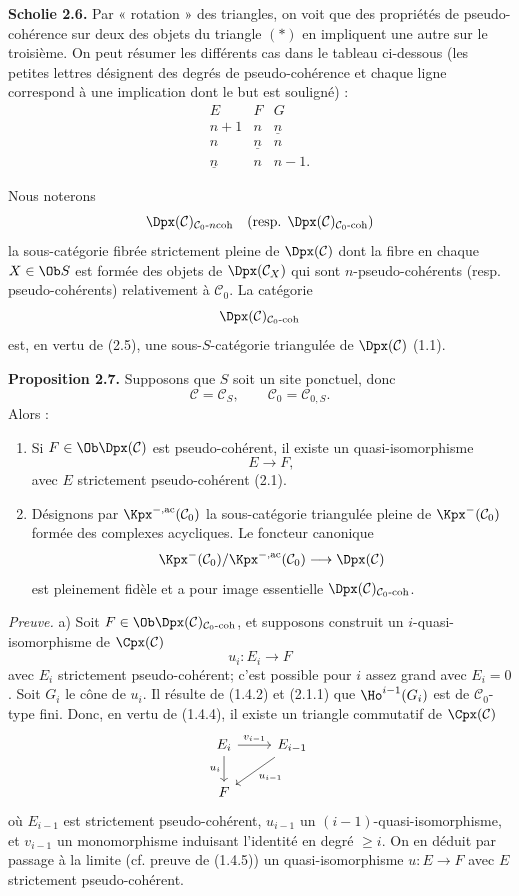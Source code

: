 \documentclass[11pt]{article}
\begin{document}
\textbf{Scholie 2.6.} Par « rotation » des triangles, on voit que des propriétés de pseudo-cohérence sur deux des objets du triangle \((*)\) en impliquent une autre sur le troisième. On peut résumer les différents cas dans le tableau ci-dessous (les petites lettres désignent des degrés de pseudo-cohérence et chaque ligne correspond à une implication dont le but est souligné) :
\[
\begin{array}{ccc}
E&F&G\\[0.2em]
n+1&n&\underline n\\
n&\underline n&n\\
\underline n&n&n-1 .
\end{array}
\]

Nous noterons
\[
  \Dpx(\mathcal C)_{\mathcal C_0\text{-}n\mathrm{coh}}
  \quad\text{(resp. }\Dpx(\mathcal C)_{\mathcal C_0\text{-}\mathrm{coh}}\text{)}
\]
la sous-catégorie fibrée strictement pleine de \(\Dpx(\mathcal C)\) dont la fibre en chaque \(X\in\Ob S\) est formée des objets de \(\Dpx(\mathcal C_X)\) qui sont \(n\)-pseudo-cohérents (resp. pseudo-cohérents) relativement à \(\mathcal C_0\). La catégorie
\[
  \Dpx(\mathcal C)_{\mathcal C_0\text{-}\mathrm{coh}}
\]
est, en vertu de (2.5), une sous-\(S\)-catégorie triangulée de \(\Dpx(\mathcal C)\) (1.1).

\textbf{Proposition 2.7.} Supposons que \(S\) soit un site ponctuel, donc
\[
  \mathcal C=\mathcal C_S,\qquad \mathcal C_0=\mathcal C_{0,S}.
\]
Alors :
\begin{enumerate}[label=\alph*)]
\item Si \(F\in\Ob\Dpx(\mathcal C)\) est pseudo-cohérent, il existe un quasi-isomorphisme
\[
  E\longrightarrow F,
\]
avec \(E\) strictement pseudo-cohérent (2.1).
\item Désignons par \(\Kpx^{-,\mathrm{ac}}(\mathcal C_0)\) la sous-catégorie triangulée pleine de \(\Kpx^-(\mathcal C_0)\) formée des complexes acycliques. Le foncteur canonique
\[
  \Kpx^-(\mathcal C_0)/\Kpx^{-,\mathrm{ac}}(\mathcal C_0)
  \longrightarrow \Dpx(\mathcal C)
\]
est pleinement fidèle et a pour image essentielle \(\Dpx(\mathcal C)_{\mathcal C_0\text{-}\mathrm{coh}}\).
\end{enumerate}

\emph{Preuve.} a) Soit \(F\in\Ob\Dpx(\mathcal C)_{\mathcal C_0\text{-}\mathrm{coh}}\), et supposons construit un \(i\)-quasi-isomorphisme de \(\Cpx(\mathcal C)\)
\[
  u_i:E_i\longrightarrow F
\]
avec \(E_i\) strictement pseudo-cohérent; c'est possible pour \(i\) assez grand avec \(E_i=0\). Soit \(G_i\) le cône de \(u_i\). Il résulte de (1.4.2) et (2.1.1) que \(\Ho^{i-1}(G_i)\) est de \(\mathcal C_0\)-type fini. Donc, en vertu de (1.4.4), il existe un triangle commutatif de \(\Cpx(\mathcal C)\)
\[
\begin{tikzcd}
E_i \arrow[r,"v_{i-1}"] \arrow[d,"u_i"'] & E_{i-1} \arrow[dl,"u_{i-1}"]\\
F &
\end{tikzcd}
\]
où \(E_{i-1}\) est strictement pseudo-cohérent, \(u_{i-1}\) un \((i-1)\)-quasi-isomorphisme, et \(v_{i-1}\) un monomorphisme induisant l'identité en degré \(\geq i\). On en déduit par passage à la limite (cf. preuve de (1.4.5)) un quasi-isomorphisme \(u:E\to F\) avec \(E\) strictement pseudo-cohérent.
\end{document}
